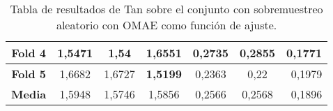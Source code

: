\begin{table}[H]
{\begin{tabular}{|crrrrrr|}
\multicolumn{1}{|c|}{\textbf{Fold 4}} & \multicolumn{1}{c|}{1,5471}            & \multicolumn{1}{c|}{1,54}                & \multicolumn{1}{c|}{1,6551}          & \multicolumn{1}{c|}{0,2735}            & \multicolumn{1}{c|}{0,2855}              & 0,1771                             \\ \hline
\multicolumn{1}{|c|}{\textbf{Fold 5}} & \multicolumn{1}{c|}{1,6682}            & \multicolumn{1}{c|}{1,6727}              & \multicolumn{1}{c|}{\textbf{1,5199}} & \multicolumn{1}{c|}{0,2363}            & \multicolumn{1}{c|}{0,22}                & 0,1979                             \\ \hline
\multicolumn{1}{|c|}{\textbf{Media}}  & \multicolumn{1}{c|}{1,5948}           & \multicolumn{1}{c|}{1,5746}             & \multicolumn{1}{c|}{1,5856}         & \multicolumn{1}{c|}{0,2566}           & \multicolumn{1}{c|}{0,2568}             & 0,1896                             \\ \hline
\end{tabular}%
}
\caption{Tabla de resultados de Tan sobre el conjunto con sobremuestreo aleatorio con OMAE como función de ajuste.}\label{tablaTANconOMAE}
\end{table}

